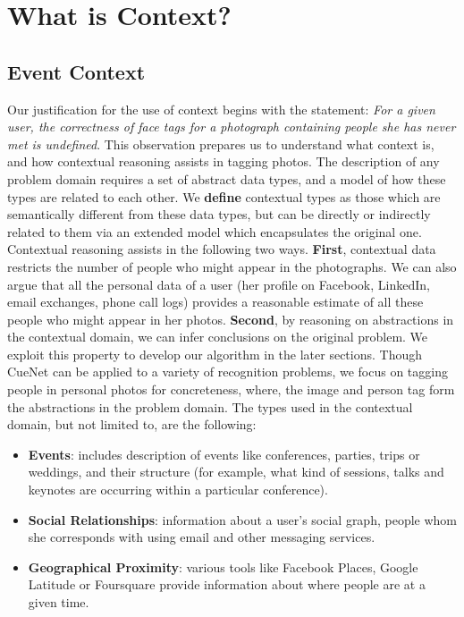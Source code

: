 \chapter{What is Context?}

\section{Event Context}
Our justification for the use of context begins with the statement: \textit{For a given user, the correctness of face tags for a photograph containing people she has never met is undefined}. This observation prepares us to understand what context is, and how contextual reasoning assists in tagging photos. The description of any problem domain requires a set of abstract data types, and a model of how these types are related to each other. We \textbf{define} contextual types as those which are semantically different from these data types, but can be directly or indirectly related to them via an extended model which encapsulates the original one. Contextual reasoning assists in the following two ways. \textbf{First}, contextual data restricts the number of people who might appear in the photographs. We can also argue that all the personal data of a user (her profile on Facebook, LinkedIn, email exchanges, phone call logs) provides a reasonable estimate of all these people who might appear in her photos. \textbf{Second}, by reasoning on abstractions in the contextual domain, we can infer conclusions on the original problem. We exploit this property to develop our algorithm in the later sections. Though CueNet can be applied to a variety of recognition problems, we focus on tagging people in personal photos for concreteness, where, the image and person tag form the abstractions in the problem domain. The types used in the contextual domain, but not limited to, are the following:

\begin{itemize}
\item \textbf{Events}: includes description of events like conferences, parties, trips or weddings, and their structure (for example, what kind of sessions, talks and keynotes are occurring within a particular conference).
\item \textbf{Social Relationships}: information about a user's social graph, people whom she corresponds with using email and other messaging services.
\item \textbf{Geographical Proximity}: various tools like Facebook Places, Google Latitude or Foursquare provide information about where people are at a given time.
\end{itemize}

